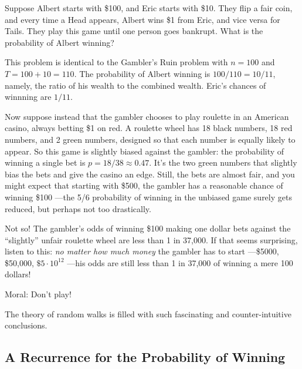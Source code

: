 \begin{staffnotes}

\begin{example}
Suppose Albert starts with \$100, and Eric starts with \$10.  They flip a
fair coin, and every time a Head appears, Albert wins \$1 from Eric, and
vice versa for Tails.  They play this game until one person goes bankrupt.
What is the probability of Albert winning?

This problem is identical to the Gambler's Ruin problem with $n=100$ and
$T=100+10=110$.  The probability of Albert winning is $100/110 = 10/11$,
namely, the ratio of his wealth to the combined wealth.  Eric's chances of
winnning are $1/11$.
\end{example}
\end{staffnotes}


Now suppose instead that the gambler chooses to play roulette in an
American casino, always betting \$1 on red.  A roulette wheel has 18 black
numbers, 18 red numbers, and 2 green numbers, designed so that each number
is equally likely to appear.  So this game is slightly biased against the
gambler: the probability of winning a single bet is $p = 18/38 \approx
0.47$.  It's the two green numbers that slightly bias the bets and give
the casino an edge.  Still, the bets are almost fair, and you might expect
that starting with \$500, the gambler has a reasonable chance of winning
\$100 ---the 5/6 probability of winning in the unbiased game surely gets
reduced, but perhaps not too drastically.

Not so!  The gambler's odds of winning \$100 making one dollar bets
against the ``slightly'' unfair roulette wheel are less than 1 in 37,000.
If that seems surprising, listen to this: \emph{no matter how much money}
the gambler has to start ---\$5000, \$50,000, $\$5 \cdot 10^{12}$ ---his
odds are still less than 1 in 37,000 of winning a mere 100 dollars!

Moral:  Don't play!

The theory of random walks is filled with such fascinating and
counter-intuitive conclusions.

\subsection{A Recurrence for the Probability of Winning}

